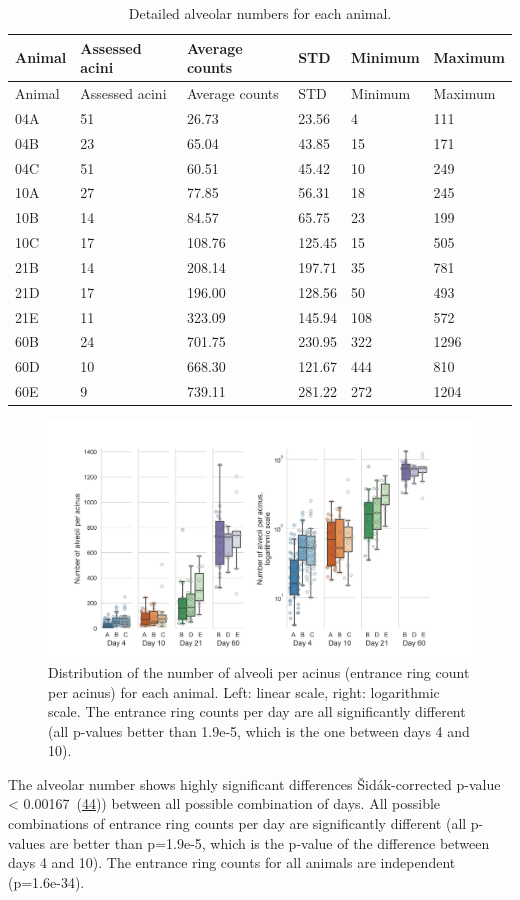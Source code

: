 \documentclass[
  american,
]{article}
\begin{document}
\begin{longtable}[]{@{}llllll@{}}
\caption{Detailed alveolar numbers for each animal. \label{tbl:counts}}\tabularnewline
\toprule
Animal & Assessed acini & Average counts & STD & Minimum & Maximum\tabularnewline
\midrule
\endfirsthead
\toprule
Animal & Assessed acini & Average counts & STD & Minimum & Maximum\tabularnewline
\midrule
\endhead
04A & 51 & 26.73 & 23.56 & 4 & 111\tabularnewline
04B & 23 & 65.04 & 43.85 & 15 & 171\tabularnewline
04C & 51 & 60.51 & 45.42 & 10 & 249\tabularnewline
10A & 27 & 77.85 & 56.31 & 18 & 245\tabularnewline
10B & 14 & 84.57 & 65.75 & 23 & 199\tabularnewline
10C & 17 & 108.76 & 125.45 & 15 & 505\tabularnewline
21B & 14 & 208.14 & 197.71 & 35 & 781\tabularnewline
21D & 17 & 196.00 & 128.56 & 50 & 493\tabularnewline
21E & 11 & 323.09 & 145.94 & 108 & 572\tabularnewline
60B & 24 & 701.75 & 230.95 & 322 & 1296\tabularnewline
60D & 10 & 668.30 & 121.67 & 444 & 810\tabularnewline
60E & 9 & 739.11 & 281.22 & 272 & 1204\tabularnewline
\bottomrule
\end{longtable}

\begin{figure}
\hypertarget{fig:02}{%
\centering
\includegraphics{images/fig02.png}
\caption{Distribution of the number of alveoli per acinus (entrance ring count per acinus) for each animal.
Left: linear scale, right: logarithmic scale.
The entrance ring counts per day are all significantly different (all p-values better than 1.9e-5, which is the one between days 4 and 10).}\label{fig:02}
}
\end{figure}

The alveolar number shows highly significant differences Šidák-corrected p-value \textless{} 0.00167~(\protect\hyperlink{ref-GtCynqsI}{44})) between all possible combination of days.
All possible combinations of entrance ring counts per day are significantly different (all p-values are better than p=1.9e-5, which is the p-value of the difference between days 4 and 10).
The entrance ring counts for all animals are independent (p=1.6e-34).
\end{document}
